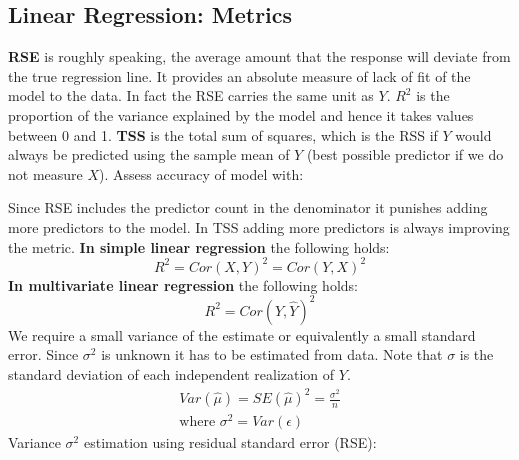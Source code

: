 \documentclass[../Main.tex]{subfiles}
\begin{document}
\subsection{Linear Regression: Metrics}
\textbf{RSE} is roughly speaking, the average amount that the response will deviate from the true regression line. It provides an absolute measure of lack of fit of the model to the data. In fact the RSE carries the same unit as \(Y\).\textbf{ \(R^2\)} is the proportion of the variance explained by the model and hence it takes values between 0 and 1. \textbf{TSS} is the total sum of squares, which is the RSS if \(Y\) would always be predicted using the sample mean of \(Y\) (best possible predictor if we do not measure \(X\)). Assess accuracy of model with:

Since RSE includes the predictor count in the denominator it punishes adding more predictors to the model.
In TSS adding more predictors is always improving the metric.
\textbf{In simple linear regression} the following holds:
\begin{equation}
    R^2 = Cor(X,Y)^2 = Cor(Y,X)^2
\end{equation}
\textbf{In multivariate linear regression} the following holds:
\begin{equation}
    R^2 = Cor(Y,\hat{Y})^2
\end{equation}
We require a small variance of the estimate or equivalently a small standard error. Since \(\sigma^2\) is unknown it has to be estimated from data. Note that \(\sigma\) is the standard deviation of each independent realization of \(Y\).
\begin{equation}
    \begin{split}
         Var(\hat{\mu}) = SE(\hat{\mu})^2 = \frac{\sigma^2}{n}\\
         \text{where } \sigma^2 = Var(\epsilon)
    \end{split}
\end{equation}
Variance \(\sigma^2\) estimation using residual standard error (RSE):
\end{document}
